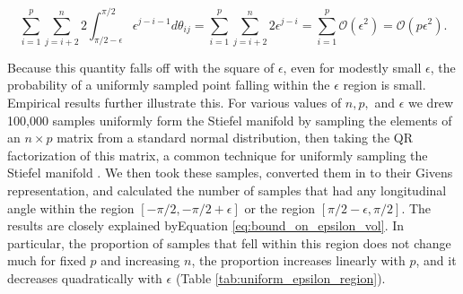 \documentclass[ba]{imsart}
\numberwithin{equation}{section}
\theoremstyle{plain}
\begin{document}
\begin{equation}
\label{eq:bound_on_epsilon_vol}
\sum_{i=1}^p \sum_{j=i+2}^n 2 \int_{\pi/2-\epsilon}^{\pi/2} \epsilon^{j-i-1} d\theta_{ij} = \sum_{i=1}^p \sum_{j=i+2}^n 2 \epsilon^{j-i} = \sum_{i=1}^p \mathcal{O}(\epsilon^2) = \mathcal{O}(p \epsilon^2).
\end{equation}

\noindent Because this quantity falls off with the square of $\epsilon$, even for modestly small $\epsilon$, the probability of a uniformly sampled point falling within the $\epsilon$ region is small. Empirical results further illustrate this. For various values of $n, p,$ and $\epsilon$ we drew 100,000 samples uniformly form the Stiefel manifold by sampling the elements of an $n \times p$ matrix from a standard normal distribution, then taking the QR factorization of this matrix, a common technique for uniformly sampling the Stiefel manifold \citep{muirhead2009aspects}. We then took these samples, converted them in to their Givens representation, and calculated the number of samples that had any longitudinal angle within the region $[-\pi/2, -\pi/2+\epsilon]$ or the region $[\pi/2-\epsilon, \pi/2]$. The results are closely explained byEquation \ref{eq:bound_on_epsilon_vol}. In particular, the proportion of samples that fell within this region does not change much for fixed $p$ and increasing $n$, the proportion increases linearly with $p$, and it decreases quadratically with $\epsilon$ (Table \ref{tab:uniform_epsilon_region}).  
\end{document}
